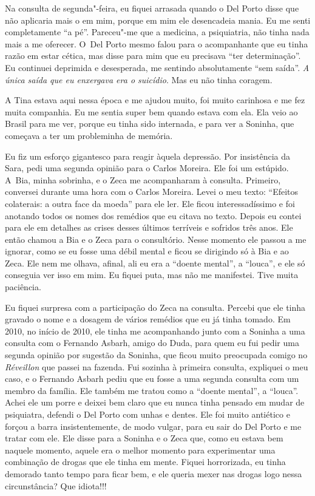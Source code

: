 Na consulta de segunda"-feira, eu fiquei arrasada quando o Del Porto
disse que não aplicaria mais o  em mim, porque em mim ele desencadeia
mania. Eu me senti completamente ``a pé''. Pareceu"-me que a medicina, a
psiquiatria, não tinha nada mais a me oferecer. O~Del Porto mesmo falou
para o acompanhante que eu tinha razão em estar cética, mas disse para
mim que eu precisava ``ter determinação''. Eu continuei deprimida e
desesperada, me sentindo absolutamente ``sem saída''. \emph{A única
saída que eu enxergava era o suicídio}. Mas eu não tinha coragem.

A Tina estava aqui nessa época e me ajudou muito, foi muito carinhosa e
me fez muita companhia. Eu me sentia super bem quando estava com ela.
Ela veio ao Brasil para me ver, porque eu tinha sido internada, e para
ver a Soninha, que começava a ter um probleminha de memória.

Eu fiz um esforço gigantesco para reagir àquela depressão. Por
insistência da Sara, pedi uma segunda opinião para o Carlos Moreira. Ele
foi um estúpido. A~Bia, minha sobrinha, e o Zeca me acompanharam à
consulta. Primeiro, conversei durante uma hora com o Carlos Moreira.
Levei o meu texto: ``Efeitos colaterais: a outra face da moeda'' para
ele ler. Ele ficou interessadíssimo e foi anotando todos os nomes dos
remédios que eu citava no texto. Depois eu contei para ele em detalhes
as crises desses últimos terríveis e sofridos três anos. Ele então
chamou a Bia e o Zeca para o consultório. Nesse momento ele passou a me
ignorar, como se eu fosse uma débil mental e ficou se dirigindo só à Bia
e ao Zeca. Ele nem me olhava, afinal, ali eu era a ``doente mental'', a
``louca'', e ele só conseguia ver isso em mim. Eu fiquei puta, mas não
me manifestei. Tive muita paciência.

Eu fiquei surpresa com a participação do Zeca na consulta. Percebi que
ele tinha gravado o nome e a dosagem de vários remédios que eu já tinha
tomado. Em 2010, no início de 2010, ele tinha me acompanhando junto com
a Soninha a uma consulta com o Fernando Asbarh, amigo do Duda, para quem
eu fui pedir uma segunda opinião por sugestão da Soninha, que ficou
muito preocupada comigo no \emph{Réveillon} que passei na fazenda. Fui
sozinha à primeira consulta, expliquei o meu caso, e o Fernando Asbarh
pediu que eu fosse a uma segunda consulta com um membro da família. Ele
também me tratou como a ``doente mental'', a ``louca''. Achei ele um
porre e deixei bem claro que eu nunca tinha pensado em mudar de
psiquiatra, defendi o Del Porto com unhas e dentes. Ele foi muito
antiético e forçou a barra insistentemente, de modo vulgar, para eu sair
do Del Porto e me tratar com ele. Ele disse para a Soninha e o Zeca que,
como eu estava bem naquele momento, aquele era o melhor momento para
experimentar uma combinação de drogas que ele tinha em mente. Fiquei
horrorizada, eu tinha demorado tanto tempo para ficar bem, e ele queria
mexer nas drogas logo nessa circunstância? Que idiota!!!

